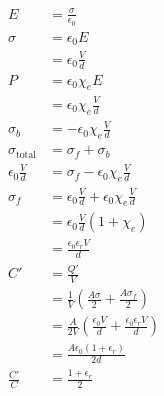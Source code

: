 \documentclass{article}
\begin{document}
\begin{align*}
  E                      & = \frac{\sigma}{\epsilon_0}                                                               \\
  \sigma                 & = \epsilon_0 E                                                                            \\
                         & = \epsilon_0 \frac{V}{d}                                                                  \\
  P                      & = \epsilon_0 \chi_e E                                                                     \\
                         & = \epsilon_0 \chi_e \frac{V}{d}                                                           \\
  \sigma_b               & = -\epsilon_0 \chi_e \frac{V}{d}                                                          \\
  \sigma_\text{total}    & = \sigma_f + \sigma_b                                                                     \\
  \epsilon_0 \frac{V}{d} & = \sigma_f - \epsilon_0 \chi_e \frac{V}{d}                                                \\
  \sigma_f               & = \epsilon_0 \frac{V}{d} + \epsilon_0 \chi_e \frac{V}{d}                                  \\
                         & = \epsilon_0 \frac{V}{d} (1 + \chi_e)                                                     \\
                         & = \frac{\epsilon_0 \epsilon_r V}{d}                                                       \\
  C'                     & = \frac{Q'}{V}                                                                            \\
                         & = \frac{1}{V} \left( \frac{A \sigma}{2} + \frac{A \sigma_f}{2} \right)                    \\
                         & = \frac{A}{2 V} \left( \frac{\epsilon_0 V}{d} + \frac{\epsilon_0 \epsilon_r V}{d} \right) \\
                         & = \frac{A \epsilon_0 (1 + \epsilon_r)}{2 d}                                               \\
  \frac{C'}{C}           & = \frac{1 + \epsilon_r}{2}
\end{align*}
\end{document}
